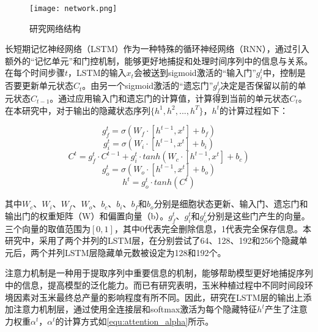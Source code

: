 \begin{figure}[ht]
  \centering
  \texttt{[image: network.png]}
  \caption{\label{fig:network}研究网络结构}
\end{figure}

\par 长短期记忆神经网络（LSTM）作为一种特殊的循环神经网络（RNN），通过引入额外的“记忆单元”和门控机制，能够更好地捕捉和处理时间序列中的信息与关系\cite{LI2019104785}。在每个时间步骤$t$，LSTM的输入$x_t$会被送到sigmoid激活的“输入门”$g_i^t$中，控制是否要更新单元状态$C_t$。由另一个sigmoid激活的“遗忘门”$g_f^t$决定是否保留以前的单元状态$C_{t-1}$。通过应用输入门和遗忘门的计算值，计算得到当前的单元状态$C_t$。在本研究中，对于输出的隐藏状态序列$\{h^1, h^2, ..., h^T\}$，$h^t$的计算过程如下：

\begin{equation}
  \label{equ:lstm1}
  g_f^t=\sigma (W_f\cdot [h^{t-1}, x^t]+b_f)
\end{equation}
\begin{equation}
  \label{equ:lstm2}
  g_i^t=\sigma (W_i\cdot [h^{t-1}, x^t]+b_i)
\end{equation}
\begin{equation}
  \label{equ:lstm3}
  C^t=g_f^t\cdot C^{t-1}+g_i^t\cdot tanh(W_c\cdot [h^{t-1}, x^t]+b_c)
\end{equation}
\begin{equation}
  \label{equ:lstm4}
  g_o^t=\sigma (W_o\cdot [h^{t-1}, x^t]+b_o)
\end{equation}
\begin{equation}
  \label{equ:lstm5}
  h^t=g_o^t\cdot tanh(C^t)
\end{equation}

\par 其中$W_c$、$W_i$、$W_f$、$W_o$、$b_c$、$b_i$、$b_f$和$b_o$分别是细胞状态更新、输入门、遗忘门和输出门的权重矩阵（W）和偏置向量（b）。$g_f^t$、$g_i^t$和$g_o^t$分别是这些门产生的向量。三个向量的取值范围为$[0,1]$，其中0代表完全删除信息，1代表完全保存信息。本研究中，采用了两个并列的LSTM层，在分别尝试了64、128、192和256个隐藏单元后，两个并列LSTM层隐藏单元数被设定为128和192个。

\par 注意力机制是一种用于提取序列中重要信息的机制，能够帮助模型更好地捕捉序列中的信息，提高模型的泛化能力。而已有研究表明，玉米种植过程中不同时间段环境因素对玉米最终总产量的影响程度有所不同\cite{shook2021crop}。因此，研究在LSTM层的输出上添加注意力机制层，通过使用全连接层和softmax激活为每个隐藏特征$h^t$产生了注意力权重$\alpha ^t$，$\alpha ^t$的计算方式如\autoref{equ:attention_alpha}所示。

